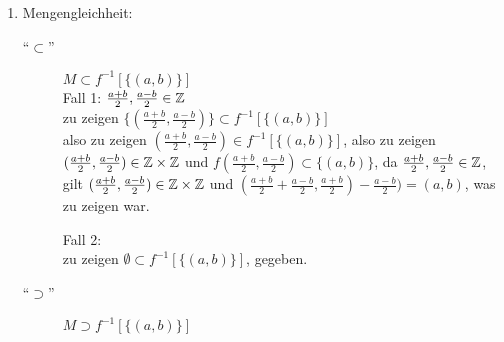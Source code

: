 \documentclass{gadsescript}
\begin{document}
\begin{enumerate}[label=(\alph*)]
\begin{proof*}[(i) -]
\begin{enumerate}[label=(\roman*)]
					Es gilt
					\begin{align*}
						f(x_1, y_1) &= f(x_2, y_2)\\
						( x_1 + y_1, x_1 - y_1) &= ( x_2 + y_2, x_2 - y_2)
					\end{align*}
					also
					\begin{align*}
						x_1 - y_1 &= x_2 - y_2\\
						x_1 - x_2 &= y_1 - y_2
					\end{align*}
					und
					\begin{align*}
						x_1 + y_1 &= x_2 + y_2\\
						\underbrace{x_1 - x_2}_{y_1 - y_2} &= y_2 - y_1\\
						y_1 - y_2 &= y_2 - y_1\\
						2y_1 &= 2y_2\\
						y_1 &= y_2
					\end{align*}
					Außerdem
					\begin{align*}
						x_1 + \underbrace{y_1}_{y_2} &= x_2 + y_2\\
						x_1 + y_2 &= x_2 + y_2\\
						x_1 &= x_2
					\end{align*}
					Also gilt $ x_1 = x_2 $ und $ y_1 = y_2 $ und somit $ (x_1, y_1) = (x_2, y_2) $\qed
				\item Mengengleichheit: 
					\begin{description}
						\item[``$\subset$''] $M \subset f^{-1}[\{(a, b)\}]$\\
							Fall 1: $\frac{a + b}{2}, \frac{a - b}{2} \in \mathbb{Z} $\\
							zu zeigen $ \{ (\frac{a+b}{2}, \frac{a-b}{2}) \} \subset f^{-1}[\{(a, b)\}]$\\
							also zu zeigen $ (\frac{a+b}{2}, \frac{a-b}{2}) \in f^{-1}[\{(a, b)\}]$,
							also zu zeigen $(\frac{a+b}{2}, \frac{a-b}{2}) \in \mathbb{Z}\times\mathbb{Z} $ und $ f(\frac{a+b}{2}, \frac{a-b}{2}) \subset \{ (a, b) \} $,
							da $\frac{a + b}{2}, \frac{a - b}{2} \in \mathbb{Z} $, gilt $ (\frac{a+b}{2}, \frac{a-b}{2}) \in \mathbb{Z}\times\mathbb{Z} $ und $ (\frac{a+b}{2} + \frac{a-b}{2}, \frac{a+b}{2}) - \frac{a-b}{2} ) = (a,b) $, was zu zeigen war.\\\par
							Fall 2:\\
							zu zeigen $ \emptyset \subset f^{-1}[\{(a, b)\}] $, gegeben.
						\item[``$\supset$''] $M \supset f^{-1}[\{(a, b)\}]$\\

\end{description}
\end{enumerate}
\end{proof*}
\end{enumerate}
\end{document}
